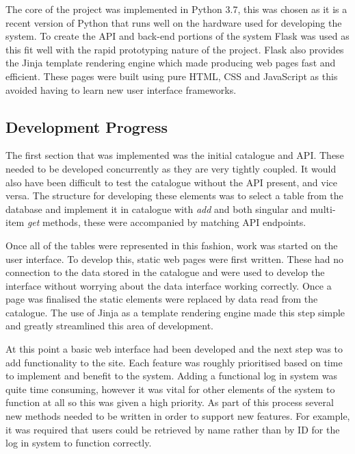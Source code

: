 \documentclass[12pt,titlepage]{article}
\begin{document}
  The core of the project was implemented in Python 3.7, this was chosen as it
  is a recent version of Python that runs well on the hardware used for
  developing the system. To create the API and back-end portions of the system
  Flask was used as this fit well with the rapid prototyping nature of the
  project. Flask also provides the Jinja template rendering engine which made
  producing web pages fast and efficient. These pages were built using pure
  HTML, CSS and JavaScript as this avoided having to learn new user interface
  frameworks.

  \subsection{Development Progress}

  The first section that was implemented was the initial catalogue and API.
  These needed to be developed concurrently as they are very tightly coupled. It
  would also have been difficult to test the catalogue without the API present,
  and vice versa. The structure for developing these elements was to select a
  table from the database and implement it in catalogue with \textit{add} and
  both singular and multi-item \textit{get} methods, these were accompanied by
  matching API endpoints.

  Once all of the tables were represented in this fashion, work was started on
  the user interface. To develop this, static web pages were first written.
  These had no connection to the data stored in the catalogue and were used to
  develop the interface without worrying about the data interface working
  correctly. Once a page was finalised the static elements were replaced by data
  read from the catalogue. The use of Jinja as a template rendering engine made this step simple and greatly streamlined this area of development.

  At this point a basic web interface had been developed and the next step was
  to add functionality to the site. Each feature was roughly prioritised based
  on time to implement and benefit to the system. Adding a functional log in
  system was quite time consuming, however it was vital for other elements of
  the system to function at all so this was given a high priority. As part of
  this process several new methods needed to be written in order to support new
  features. For example, it was required that users could be retrieved by name
  rather than by ID for the log in system to function correctly.
\end{document}
